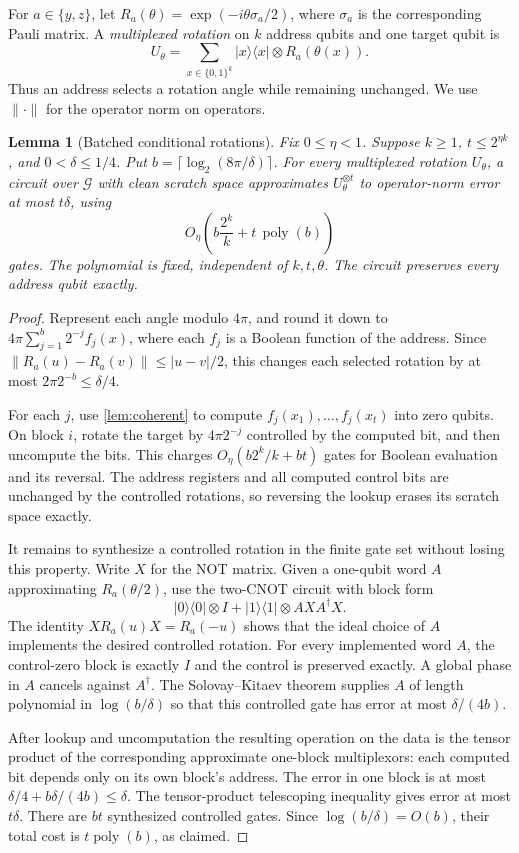 \documentclass[11pt]{article}
\newtheorem{lemma}[lemma]{Lemma}
\newcommand{\bits}{\{0,1\}}
\newcommand{\poly}{\operatorname{poly}}
\begin{document}
For $a\in\{y,z\}$, let $R_a(\theta)=\exp(-i\theta\sigma_a/2)$,
where $\sigma_a$ is the corresponding Pauli matrix.  A \emph{multiplexed
rotation} on $k$ address qubits and one target qubit is
\[
 U_\theta=\sum_{x\in\bits^k}|x\rangle\langle x|
                           \otimes R_a(\theta(x)).
\]
Thus an address selects a rotation angle while remaining unchanged.
We use $\|\cdot\|$ for the operator norm on operators.

\begin{lemma}[Batched conditional rotations]\label{lem:quantum-rotation}
Fix $0\le\eta<1$.  Suppose $k\ge1$, $t\le2^{\eta k}$, and
$0<\delta\le1/4$.  Put $b=\lceil\log_2(8\pi/\delta)\rceil$.
For every multiplexed rotation $U_\theta$, a circuit over $\mathcal G$
with clean scratch space approximates $U_\theta^{\otimes t}$ to
operator-norm error at most $t\delta$, using
\[
 O_\eta\!\left(b\frac{2^k}{k}+t\,\poly(b)\right)
\]
gates.  The polynomial is fixed, independent of $k,t,\theta$.
The circuit preserves every address qubit exactly.
\end{lemma}

\begin{proof}
Represent each angle modulo $4\pi$, and round it down to
$4\pi\sum_{j=1}^b2^{-j}f_j(x)$, where each $f_j$ is a Boolean
function of the address.  Since
$\|R_a(u)-R_a(v)\|\le |u-v|/2$, this changes each selected rotation
by at most $2\pi2^{-b}\le\delta/4$.

For each $j$, use \cref{lem:coherent} to compute
$f_j(x_1),\ldots,f_j(x_t)$ into zero qubits.  On block $i$, rotate
the target by $4\pi2^{-j}$ controlled by the computed bit, and then
uncompute the bits.  This charges
$O_\eta(b2^k/k+bt)$ gates for Boolean evaluation and its reversal.
The address registers and all computed control bits are unchanged by
the controlled rotations, so reversing the lookup erases its scratch
space exactly.

It remains to synthesize a controlled rotation in the finite gate set
without losing this property.  Write $X$ for the NOT matrix.  Given a
one-qubit word $A$ approximating $R_a(\theta/2)$, use the two-CNOT
circuit with block form
\[
 |0\rangle\langle0|\otimes I+
 |1\rangle\langle1|\otimes A X A^\dagger X.
\]
The identity $X R_a(u)X=R_a(-u)$ shows that the ideal choice of $A$
implements the desired controlled rotation.  For every implemented
word $A$, the control-zero block is exactly $I$ and the control is
preserved exactly.  A global phase in $A$ cancels against $A^\dagger$.
The Solovay--Kitaev theorem \cite{DawsonNielsen2006} supplies $A$ of
length polynomial in $\log(b/\delta)$ so that this controlled gate
has error at most $\delta/(4b)$.

After lookup and uncomputation the resulting operation on the data is
the tensor product of the corresponding approximate one-block
multiplexors: each computed bit depends only on its own block's address.
The error in one block is at most $\delta/4+b\delta/(4b)\le\delta$.
The tensor-product telescoping inequality gives error at most $t\delta$.
There are $bt$ synthesized controlled gates.  Since
$\log(b/\delta)=O(b)$, their total cost is $t\poly(b)$, as claimed.
\end{proof}
\end{document}
